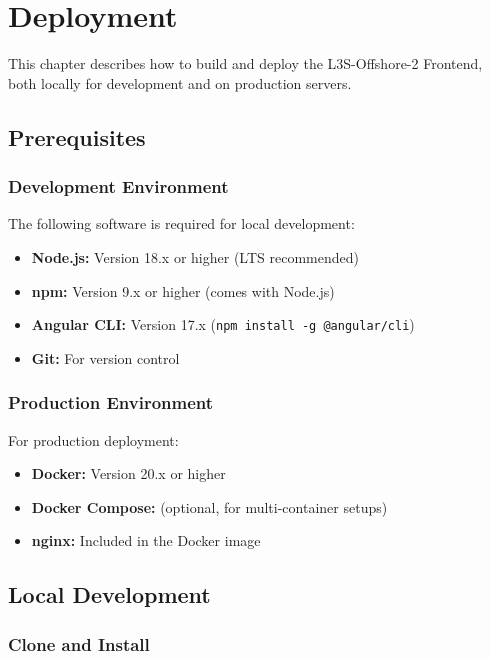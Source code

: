 \chapter{Deployment}
\label{chap:deployment}

This chapter describes how to build and deploy the L3S-Offshore-2 Frontend, both locally for development and on production servers.

\section{Prerequisites}
\label{sec:prerequisites}

\subsection{Development Environment}

The following software is required for local development:

\begin{itemize}
    \item \textbf{Node.js:} Version 18.x or higher (LTS recommended)
    \item \textbf{npm:} Version 9.x or higher (comes with Node.js)
    \item \textbf{Angular CLI:} Version 17.x (\texttt{npm install -g @angular/cli})
    \item \textbf{Git:} For version control
\end{itemize}

\subsection{Production Environment}

For production deployment:

\begin{itemize}
    \item \textbf{Docker:} Version 20.x or higher
    \item \textbf{Docker Compose:} (optional, for multi-container setups)
    \item \textbf{nginx:} Included in the Docker image
\end{itemize}

\section{Local Development}
\label{sec:local-development}

\subsection{Clone and Install}


